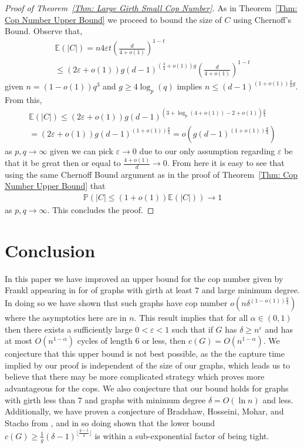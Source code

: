 \documentclass{amsart}
\theoremstyle{definition}
\def\epsilon{\varepsilon}
\begin{document}
\begin{proof}[Proof of Theorem~\ref{Thm: Large Girth Small Cop Number}]
As in Theorem~\ref{Thm: Cop Number Upper Bound} we proceed to bound the size of $C$ using Chernoff's Bound. Observe that, 
\begin{align*}
\mathbb{E}(|C|) = n 4\epsilon t (\frac{d}{4+o(1)})^{1-t} \\
\leq  (2\epsilon + o(1)) g (d-1)^{(\frac{3}{4}+o(1))g}  (\frac{d}{4+o(1)})^{1-t} 
\end{align*}
given $n = (1-o(1))q^3$ and $g \geq 4 \log_{p}(q)$ implies $n \leq (d-1)^{(1+o(1))\frac{3}{4}g}$. From this, 
\begin{align*}
\mathbb{E}(|C|) \leq (2\epsilon+o(1)) g (d-1)^{(3 + \log_{p}(4+o(1)) - 2+ o(1)) \frac{g}{4}} \\
= (2\epsilon+o(1)) g (d-1)^{(1+o(1))\frac{g}{4}}
= o(g (d-1)^{(1+o(1))\frac{g}{4}})
\end{align*}
as $p,q \rightarrow \infty$ given we can pick $\epsilon \rightarrow 0$ due to our only assumption regarding $\epsilon$ be that it be great then or equal to $\frac{4+o(1)}{d} \rightarrow 0$. From here it is easy to see that using the same Chernoff Bound argument as in the proof of Theorem~\ref{Thm: Cop Number Upper Bound} that
\begin{align*}
\mathbb{P}(|C| \leq (1+o(1))\mathbb{E}(|C|)) \rightarrow 1
\end{align*}
as $p,q \rightarrow \infty$. This concludes the proof.
\end{proof}









\vspace{0.5cm}
\section{Conclusion}

In this paper we have improved an upper bound for the cop number given by Frankl appearing in \cite{frankl1987cops} for of graphs with girth at least $7$ and large minimum degree. In doing so we have shown that such graphs have cop number $o(n \delta^{(1-o(1))\frac{g}{4}})$ where the asymptotics here are in $n$. This result implies that for all $\alpha \in (0,1)$ then there exists a sufficiently large $0< \epsilon< 1$ such that if $G$ has $\delta \geq n^{\epsilon}$ and has at most $O(n^{1-\alpha})$ cycles of length $6$ or less, then $c(G) = O(n^{1-\alpha})$. We conjecture that this upper bound is not best possible, as the the capture time implied by our proof is independent of the size of our graphs, which leads us to believe that there may be more complicated strategy which proves more advantageous for the cops. We also conjecture that our bound holds for graphs with girth less than $7$ and graphs with minimum degree $\delta = O(\ln{n})$ and less. Additionally, we have proven a conjecture of Bradshaw, Hosseini, Mohar, and Stacho from \cite{bradshaw2023cop}, and in so doing shown that the lower bound $c(G) \geq \frac{1}{g} (\delta - 1)^{\lfloor \frac{g-1}{4}\rfloor}$ is within a sub-exponential factor of being tight.
\end{document}
